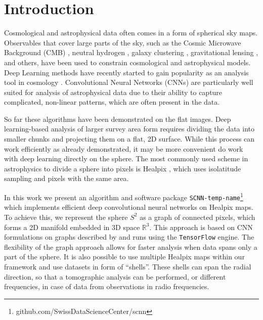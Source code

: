 \documentclass[final,twocolumn,3p,times,authoryear]{elsarticle}
\newcommand{\assign}[1]{{\color[rgb]{.8,.5,.8}{Assigned: #1 }}}
\newcommand{\1}{\b{1}}              %
\newcommand{\0}{\b{0}}              %
\newcommand{\pkg}[1]{\texttt{#1}}
\begin{document}

\section{Introduction}
\label{sec:intro}

\assign{Tomek}

Cosmological and astrophysical data often comes in a form of spherical sky maps.
Observables that cover large parts of the sky, such as the Cosmic Microwave Background (CMB) \citep{planck2015cosmologicalparameters,komatsu2011sevenyear,staggs2018recentdiscoveries}, neutral hydrogen \citep{santos2015cosmologySKA,HI4PI2016fullskyHI}, galaxy clustering \citep{alam2017clusteringgalaxies}, gravitational lensing \citep{troxel2017darkenergy,hildebrandt2017kidscosmological}, and others, have been used to constrain cosmological and astrophysical models. Deep Learning methods have recently started to gain popularity as an analysis tool in cosmology \citep{schmelze2017cosmologicalmodel,luciesmith2018machinelearning,gupta2018nongaussianinformation,gillet2018deeplearning,hassan2018reionizationmodels,aragoncalvo2018classyfyinglarge,ciuca2017cnnstring}.
Convolutional Neural Networks (CNNs) are particularly well suited for analysis of astrophysical data due to their ability to capture complicated, non-linear patterns, which are often present in the data.

So far these algorithms have been demonstrated on the flat images.
Deep learning-based analysis of larger survey area form requires dividing the data into smaller chunks and projecting them on a flat, 2D surface.
While this process can work efficiently as already demonstrated, it may be more convenient do work with deep learning directly on the sphere.
The most commonly used scheme in astrophysics to divide a sphere into pixels is Healpix \citep{gorski2005healpix}, which uses isolatitude sampling and pixels with the same area.

In this work we present an algorithm and software package \pkg{SCNN-temp-name}\footnote{github.com/SwissDataScienceCenter/scnn} which implements efficient deep convolutional neural networks on Healpix maps.
To achieve this, we represent the sphere $S^2$ as a graph of connected pixels, which forms a 2D manifold embedded in 3D space $\mathbb{R}^3$.
This approach is based on CNN formulations on graphs described by \citet{defferrard2016convolutional} and runs using the \pkg{TensorFlow} \citep{abadi2016tensorflow} engine.
The flexibility of the graph approach allows for faster analysis when data spans only a part of the sphere.
It is also possible to use multiple Healpix maps within our framework and use datasets in form of ``shells''.
These shells can span the radial direction, so that a tomographic analysis can be performed, or different frequencies, in case of data from observations in radio frequencies.
\end{document}
